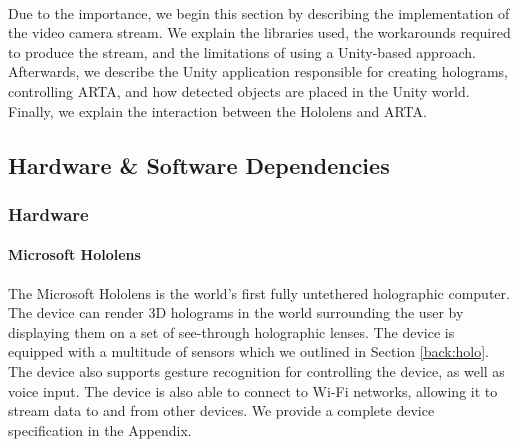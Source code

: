 \paragraph{} Due to the importance, we begin this section by describing the implementation of the video camera stream. We explain the libraries used, the workarounds required to produce the stream, and the limitations of using a Unity-based approach. Afterwards, we describe the Unity application responsible for creating holograms, controlling ARTA, and how detected objects are placed in the Unity world. Finally, we explain the interaction between the Hololens and ARTA.

\subsection{Hardware \& Software Dependencies}
\subsubsection{Hardware}
\paragraph{Microsoft Hololens} The Microsoft Hololens is the world's first fully untethered holographic computer. The device can render 3D holograms in the world surrounding the user by displaying them on a set of see-through holographic lenses. The device is equipped with a multitude of sensors which we outlined in Section \ref{back:holo}. The device also supports gesture recognition for controlling the device, as well as voice input. The device is also able to connect to Wi-Fi networks, allowing it to stream data to and from other devices. We provide a complete device specification in the Appendix.

